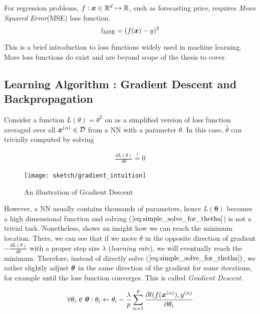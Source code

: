 For regression problems, $ f : \boldsymbol{x} \in \mathbb{R}^d  \mapsto \mathbb{R}$, such as forecasting price, requires \textit{Mean Squared Error}(MSE) loss function.
$$
l_{\text{MSE}} = (f(\boldsymbol{x}) - y)^2
$$

This is a brief introduction to loss functions widely used in machine learning. More loss functions do exist and are beyond scope of the thesis to cover.

\subsection{Learning Algorithm : Gradient Descent and Backpropagation}
Consider a  function $L(\theta) = \theta^2$ on \addfigure{\ref{fig:gradent_descent_toy}} as a simplified version of loss function averaged over all $\xa \in \mathcal{D}$  from a NN with a parameter $\theta$. In this case, $\hat{\theta}$ can trivially computed by solving

\begin{align}
	\frac{d L(\theta)}{d \theta}  \stackrel{!}{=} 0
	\label{eq:simple_solve_for_thetha}
\end{align}

\begin{figure}[ht!]
    \begin{center}
		\texttt{[image: sketch/gradient\_intuition]}
		\caption[]{An illustration of Gradient Descent}
		\label{fig:gradent_descent_toy}
	\end{center}
\end{figure}

However, a NN usually contains thousands of parameters, hence $L(\boldsymbol{\theta})$ becomes a high dimensional function and solving ($\ref{eq:simple_solve_for_thetha}$) is not a trivial task. Nonetheless, \addfigure{\ref{fig:gradent_descent_toy}} shows an insight how we can reach the minimum location. There, we can see that if we move $\theta$ in the opposite direction of gradient $	-\frac{d L(\theta)}{d \theta}$ with a proper step size $\lambda$ (\textit{learning rate}), we will eventually reach the minimum. Therefore, instead of directly solve ($\ref{eq:simple_solve_for_thetha})$, we rather slightly adjust $\boldsymbol{\theta}$ in the same direction of the gradient for some iterations, for example until the loss function converges. This is called \textit{Gradient Descent}.

\begin{align*}
\forall \theta_i \in \btheta :  \theta_i \leftarrow \theta_i - \frac{\lambda}{p} \sum_{\alpha=1}^{p} \frac{\partial l(f(\xa), \ya }{\partial \theta_i } 
\label{eq:gradient_update}
\end{align*}


